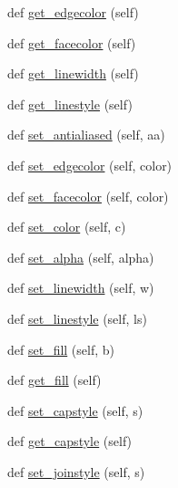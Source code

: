 \begin{DoxyCompactItemize}
\item 
def \hyperlink{classmatplotlib_1_1patches_1_1Patch_a4a97b51c44cfa8044643ebc247f4c68d}{get\+\_\+edgecolor} (self)
\item 
def \hyperlink{classmatplotlib_1_1patches_1_1Patch_ad1334dca84a093592bc52f4671561e1a}{get\+\_\+facecolor} (self)
\item 
def \hyperlink{classmatplotlib_1_1patches_1_1Patch_a5716b76f843492ce79264dd5901c83c0}{get\+\_\+linewidth} (self)
\item 
def \hyperlink{classmatplotlib_1_1patches_1_1Patch_aac767d328b1555537c35dcb654f2611a}{get\+\_\+linestyle} (self)
\item 
def \hyperlink{classmatplotlib_1_1patches_1_1Patch_a2839742015542a191e6bf196820f0150}{set\+\_\+antialiased} (self, aa)
\item 
def \hyperlink{classmatplotlib_1_1patches_1_1Patch_ad6b45fb45cd1414fc6b9018508bf35f5}{set\+\_\+edgecolor} (self, color)
\item 
def \hyperlink{classmatplotlib_1_1patches_1_1Patch_aa4f12577a9b857e248dbe0de69881f9b}{set\+\_\+facecolor} (self, color)
\item 
def \hyperlink{classmatplotlib_1_1patches_1_1Patch_a90e30daa7a13e8f5df0c149d3da85d5c}{set\+\_\+color} (self, c)
\item 
def \hyperlink{classmatplotlib_1_1patches_1_1Patch_af6c305175ef840d606397d956acd37a1}{set\+\_\+alpha} (self, alpha)
\item 
def \hyperlink{classmatplotlib_1_1patches_1_1Patch_ae458615c2f8ccc07d057dd669afb0239}{set\+\_\+linewidth} (self, w)
\item 
def \hyperlink{classmatplotlib_1_1patches_1_1Patch_a71a1b34b00b9744766c34716f47c67d9}{set\+\_\+linestyle} (self, ls)
\item 
def \hyperlink{classmatplotlib_1_1patches_1_1Patch_a0abc3f61cef5f57b7545efa0de0ba060}{set\+\_\+fill} (self, b)
\item 
def \hyperlink{classmatplotlib_1_1patches_1_1Patch_a9c4c6e91f93689050568889e687bcb56}{get\+\_\+fill} (self)
\item 
def \hyperlink{classmatplotlib_1_1patches_1_1Patch_ab36f68f108c5980b3613d06903b48239}{set\+\_\+capstyle} (self, s)
\item 
def \hyperlink{classmatplotlib_1_1patches_1_1Patch_a29c9c79492824101a7de0c803bb7d6b2}{get\+\_\+capstyle} (self)
\item 
def \hyperlink{classmatplotlib_1_1patches_1_1Patch_a68b7a8290643067d2d3cd08346992671}{set\+\_\+joinstyle} (self, s)
\item 

\end{DoxyCompactItemize}
